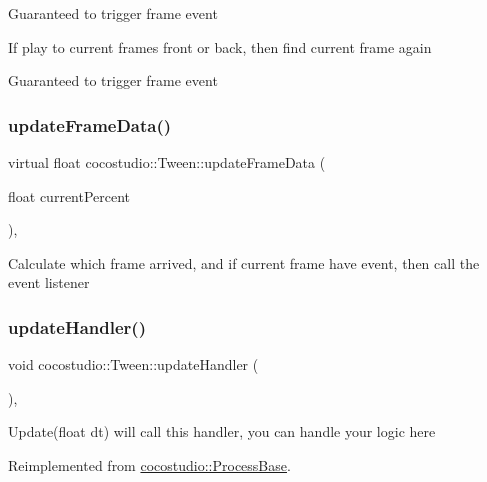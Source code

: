 Guaranteed to trigger frame event

If play to current frame\textquotesingle{}s front or back, then find current frame again

Guaranteed to trigger frame event \mbox{\label{classcocostudio_1_1Tween_aa609249406b24251ada17de2b645bc77}} 
\subsubsection{\texorpdfstring{update\+Frame\+Data()}{updateFrameData()}\hspace{0.1cm}{\footnotesize\ttfamily [2/2]}}
{\footnotesize\ttfamily virtual float cocostudio\+::\+Tween\+::update\+Frame\+Data (\begin{DoxyParamCaption}\item[{float}]{current\+Percent }\end{DoxyParamCaption})\hspace{0.3cm}{\ttfamily [protected]}, {\ttfamily [virtual]}}

Calculate which frame arrived, and if current frame have event, then call the event listener \mbox{\label{classcocostudio_1_1Tween_a35d383d868e393dc518c1197fc3a00ff}} 
\subsubsection{\texorpdfstring{update\+Handler()}{updateHandler()}\hspace{0.1cm}{\footnotesize\ttfamily [1/2]}}
{\footnotesize\ttfamily void cocostudio\+::\+Tween\+::update\+Handler (\begin{DoxyParamCaption}{ }\end{DoxyParamCaption})\hspace{0.3cm}{\ttfamily [protected]}, {\ttfamily [virtual]}}

Update(float dt) will call this handler, you can handle your logic here 

Reimplemented from \hyperlink{classcocostudio_1_1ProcessBase_adb15615e852617daf7a4f13b17bfc553}{cocostudio\+::\+Process\+Base}.

